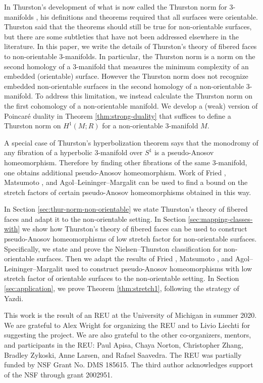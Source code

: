  In Thurston's development of what is now called the Thurston norm for 3-manifolds \cite{thurston1986norm}, his definitions and theorems required that all surfaces were orientable.  Thurston said that the theorems should still be true for non-orientable surfaces, but there are some subtleties that have not been addressed elsewhere in the literature.  In this paper, we write the details of Thurston's theory of fibered faces to non-orientable 3-manifolds.  In particular, the Thurston norm is a norm on the second homology of a 3-manifold that measures the minimum complexity of an embedded (orientable) surface. However the Thurston norm does not recognize embedded non-orientable surfaces in the second homology of a non-orientable 3-manifold.  To address this limitation, we instead calculate the Thurston norm on the first cohomology of a non-orientable manifold.  We develop a (weak) version of Poincar\'e duality in Theorem \ref{thm:strong-duality} that suffices to define a Thurston norm on $H^1(M;R)$ for a non-orientable 3-manifold $M$.

 A special case of Thurston's hyperbolization theorem says that the monodromy of any fibration of a hyperbolic 3-manifold over $S^1$ is a pseudo-Anosov homeomorphism.  Therefore by finding other fibrations of the same 3-manifold, one obtains additional pseudo-Anosov homeomorphism.  Work of Fried \cite{fried1982flow,fried1983transitive}, Matsumoto \cite{matsumoto1987topological}, and Agol--Leininger--Margalit \cite{agol6983pseudo} can be used to find a bound on the stretch factors of certain pseudo-Anosov homeomorphisms obtained in this way.



 In Section \ref{sec:thur-norm-non-orientable} we state Thurston's theory of fibered faces and adapt it to the non-orientable setting.  In Section \ref{sec:mapping-classes-with} we show how Thurston's theory of fibered faces can be used to construct pseudo-Anosov homeomorphisms of low stretch factor for non-orientable surfaces.  Specifically, we state and prove the Nielsen--Thurston classification for non-orientable surfaces.  Then we adapt the results of Fried \cite{fried1982flow,fried1983transitive}, Matsumoto \cite{matsumoto1987topological}, and Agol--Leininger--Margalit \cite{agol6983pseudo} used to construct pseudo-Anosov homeomorphisms with low stretch factor of orientable surfaces to the non-orientable setting.  In Section \ref{sec:application}, we prove Theorem \ref{thm:stretch1}, following the strategy of Yazdi.

This work is the result of an REU at the University of Michigan in summer 2020.  We are grateful to Alex Wright for organizing the REU and to Livio Liechti for suggesting the project. We are also grateful to the other co-organizers, mentors, and participants in the REU: Paul Apisa, Chaya Norton, Christopher Zhang, Bradley Zykoski, Anne Larsen, and Rafael Saavedra. The REU was partially funded by NSF Grant No. DMS 185615.  The third author acknowledges support of the NSF through grant 2002951.



